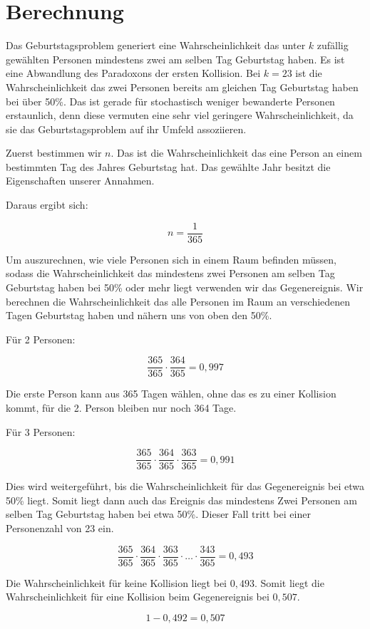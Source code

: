 \documentclass[../main.tex]{subfiles}
\begin{document}
\section{Berechnung}

Das Geburtstagsproblem generiert eine Wahrscheinlichkeit das unter \(k\) zufällig gewählten Personen mindestens zwei am
selben Tag Geburtstag haben. Es ist eine Abwandlung des Paradoxons der ersten Kollision. \cite{henze} Bei \(k=23\) ist die
Wahrscheinlichkeit das zwei Personen bereits am gleichen Tag Geburtstag haben bei über 50\%. Das ist gerade für
stochastisch weniger bewanderte Personen erstaunlich, denn diese vermuten eine sehr viel geringere Wahrscheinlichkeit,
da sie das Geburtstagsproblem auf ihr Umfeld assoziieren.

Zuerst bestimmen wir \(n\).
Das ist die Wahrscheinlichkeit das eine Person an einem bestimmten Tag des Jahres Geburtstag hat.
Das gewählte Jahr besitzt die Eigenschaften unserer Annahmen.

Daraus ergibt sich:

\begin{equation}
n = \frac{1}{365}
\end{equation}

Um auszurechnen, wie viele Personen sich in einem Raum befinden müssen, sodass die Wahrscheinlichkeit
das mindestens zwei Personen am selben Tag Geburtstag haben bei 50\% oder mehr liegt verwenden wir das Gegenereignis.
Wir berechnen die Wahrscheinlichkeit das alle Personen im Raum an verschiedenen Tagen Geburtstag haben und nähern uns
von oben den 50\%.

Für 2 Personen:

\begin{equation}
 \frac{365}{365} \cdot \frac{364}{365} = 0,997
\end{equation}

Die erste Person kann aus 365 Tagen wählen, ohne das es zu einer Kollision kommt, für die 2. Person bleiben nur noch 364 Tage.

Für 3 Personen:

\begin{equation}
 \frac{365}{365} \cdot \frac{364}{365} \cdot \frac{363}{365} = 0,991
\end{equation}

Dies wird weitergeführt, bis die Wahrscheinlichkeit für das Gegenereignis bei etwa 50\% liegt.
Somit liegt dann auch das Ereignis das mindestens Zwei Personen am selben Tag Geburtstag haben bei etwa 50\%.
Dieser Fall tritt bei einer Personenzahl von 23 ein.

\begin{equation}
 \frac{365}{365} \cdot \frac{364}{365} \cdot \frac{363}{365} \cdot \dots \cdot \frac{343}{365} = 0,493
\end{equation}

Die Wahrscheinlichkeit für keine Kollision liegt bei $0,493$.
Somit liegt die Wahrscheinlichkeit für eine Kollision beim Gegenereignis bei $0,507$.

\begin{equation}
 1-0,492 = 0,507
\end{equation}
\end{document}
